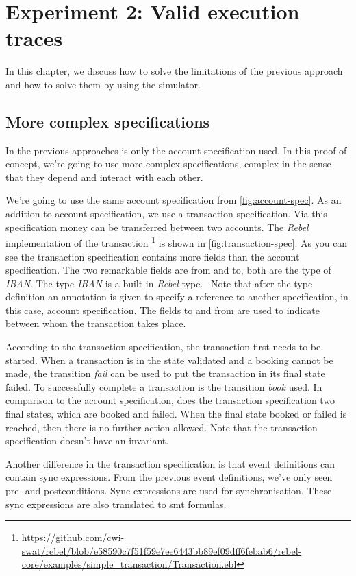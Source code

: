 \chapter{Experiment 2: Valid execution traces}\label{sec:ch5}

In this chapter, we discuss how to solve the limitations of the previous
approach and how to solve them by using the simulator.

\section{More complex specifications}\label{sec:ch5-complex-spec}
In the previous approaches is only the account specification used. In this proof
of concept, we're going to use more complex specifications, complex in the sense
that they depend and interact with each other.

We're going to use the
same account specification from \autoref{fig:account-spec}. As an addition to
account specification, we use a transaction specification. Via this
specification money can be transferred between two accounts.
The \textit{Rebel} implementation of the transaction \footnote{\url{https://github.com/cwi-swat/rebel/blob/e58590c7f51f59e7ee6443bb89ef09dff6febab6/rebel-core/examples/simple_transaction/Transaction.ebl}} is shown in \autoref{fig:transaction-spec}.
As you can see the transaction specification contains more fields than the
account specification. The two remarkable fields are from and to, both are the
type of \textit{IBAN}. The type \textit{IBAN} is a built-in \textit{Rebel}
type.~\cite[p.~3]{stoel_storm_vinju_bosman_2016} Note that after the type
definition an annotation is given to specify a reference to another
specification, in this case, account specification. The fields to and from are
used to indicate between whom the transaction takes place.

According to the transaction specification, the transaction first
needs to be started. When a transaction is in the state validated and a booking
cannot be made, the transition \textit{fail} can be used to put the transaction in its
final state failed. To successfully complete a transaction is the transition
\textit{book} used. In comparison to the account specification, does the transaction
specification two final states, which are booked and failed. When the final
state booked or failed is reached, then there is no further action allowed.
Note that the transaction specification doesn't have an invariant.

Another difference in the transaction specification is that event definitions
can contain sync expressions. From the previous event definitions, we've only
seen pre- and postconditions. Sync expressions are used for synchronisation.
These sync expressions are also translated to \gls{smt} formulas.

